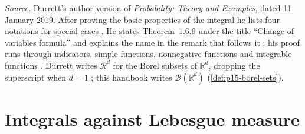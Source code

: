 \emph{Source.} Durrett's author version of \emph{Probability: Theory and
Examples}, dated 11 January 2019. After proving the basic properties of the
integral he lists four notations for special cases
\cite[sec.~1.4, pp.~23--24]{DurrettPTEAuthor2019}. He states
Theorem~1.6.9 under the title ``Change of variables formula'' and explains
the name in the remark that follows it
\cite[thm.~1.6.9, p.~32]{DurrettPTEAuthor2019}; his proof runs through
indicators, simple functions, nonnegative functions and integrable
functions \cite[pp.~32--33]{DurrettPTEAuthor2019}. Durrett writes
\(\mathcal R^d\) for the Borel subsets of \(\mathbb R^d\), dropping the
superscript when \(d=1\) \cite[p.~3]{DurrettPTEAuthor2019}; this handbook
writes \(\mathcal B(\mathbb R^d)\) (\cref{def:p15-borel-sets}).

\section{Integrals against Lebesgue measure}
\label{sec:p15-w02c-p15-001-dx-notation}

